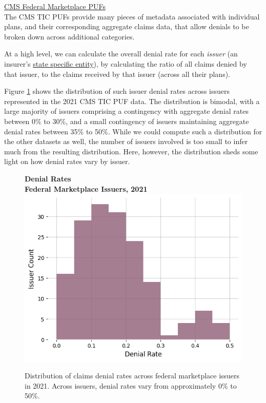 \documentclass[12pt, a4paper,twoside,parskip=full]{report}
\theoremstyle{plain} %
\theoremstyle{definition} %
\theoremstyle{remark} %
\numberwithin{equation}{chapter}
\begin{document}
		
		
		\underline{CMS Federal Marketplace PUFs}\\
		
		The CMS TIC PUFs provide many pieces of metadata associated with individual plans, and their corresponding aggregate claims data, that allow denials to be broken down across additional categories.
		
		At a high level, we can calculate the overall denial rate for each \emph{issuer} (an insurer's \href{https://www.law.cornell.edu/definitions/uscode.php?width=840&height=800&iframe=true&def_id=26-USC-392827901-289353966&term_occur=1&term_src=}{state specific entity}), by calculating the ratio of all claims denied by that issuer, to the claims received by that issuer (across all their plans).
		
		Figure \ref{federalissuerdenialdist} shows the distribution of such issuer denial rates across issuers represented in the 2021 CMS TIC PUF data. The distribution is bimodal, with a large majority of issuers comprising a contingency with aggregate denial rates between 0\% to 30\%, and a small contingency of issuers maintaining aggregate denial rates between 35\% to 50\%. While we could compute such a distribution for the other datasets as well, the number of issuers involved is too small to infer much from the resulting distribution. Here, however, the distribution sheds some light on how denial rates vary by issuer.
		
		
		\begin{figure}[h!]
			\centering
			\textbf{Denial Rates}\\
			\textbf{Federal Marketplace Issuers, 2021}\\
			\includegraphics[width=\columnwidth]{images/cms_puf/denial_rates_all_insurers.png}
			\caption{Distribution of claims denial rates across federal marketplace issuers in 2021. Across issuers, denial rates vary from approximately 0\% to 50\%.}
			\label{federalissuerdenialdist}
		\end{figure}
	
\end{document}
